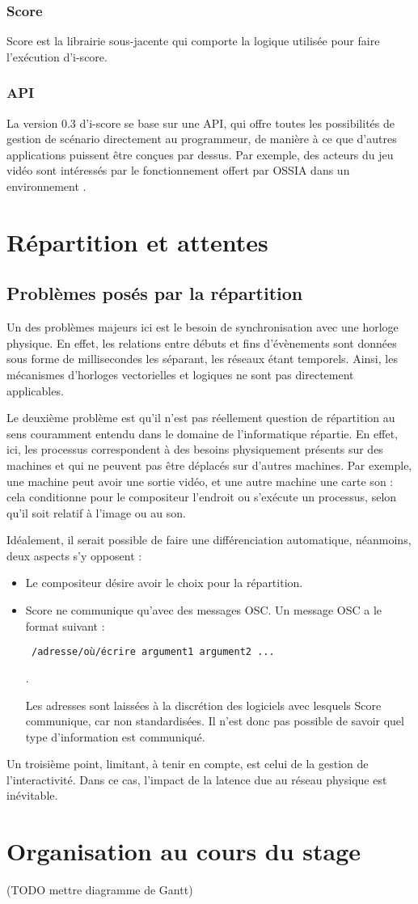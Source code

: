 \subsubsection{Score}
Score est la librairie sous-jacente qui comporte la logique utilisée pour faire l'exécution d'i-score.

\subsubsection{API}
La version 0.3 d'i-score se base sur une \ac{API}, qui offre toutes les possibilités de gestion de scénario directement au programmeur, de manière à ce que d'autres applications puissent être conçues par dessus. Par exemple, des acteurs du jeu vidéo sont intéressés par le fonctionnement offert par \ac{OSSIA} dans un environnement . 

\section{Répartition et attentes}
\subsection{Problèmes posés par la répartition}
Un des problèmes majeurs ici est le besoin de synchronisation avec une horloge physique. En effet, les relations entre débuts et fins d'évènements sont données sous forme de millisecondes les séparant, les réseaux étant temporels. Ainsi, les mécanismes d'horloges vectorielles et logiques ne sont pas directement applicables.

Le deuxième problème est qu'il n'est pas réellement question de répartition au sens couramment entendu dans le domaine de l'informatique répartie. En effet, ici, les processus correspondent à des besoins physiquement présents sur des machines et qui ne peuvent pas être déplacés sur d'autres machines. Par exemple, une machine peut avoir une sortie vidéo, et une autre machine une carte son : cela conditionne pour le compositeur l'endroit ou s'exécute un processus, selon qu'il soit relatif à l'image ou au son.

Idéalement, il serait possible de faire une différenciation automatique, néanmoins, deux aspects s'y opposent : 
\begin{itemize}
\item Le compositeur désire avoir le choix pour la répartition.
\item Score ne communique qu'avec des messages \ac{OSC}. Un message \ac{OSC} a le format suivant : 
\begin{verbatim} /adresse/où/écrire argument1 argument2 ... \end{verbatim}.

Les adresses sont laissées à la discrétion des logiciels avec lesquels Score communique, car non standardisées. Il n'est donc pas possible de savoir quel type d'information est communiqué. 
\end{itemize}
Un troisième point, limitant, à tenir en compte, est celui de la gestion de l'interactivité. Dans ce cas, l'impact de la latence due au réseau physique est inévitable.
\section{Organisation au cours du stage}
(TODO mettre diagramme de Gantt)